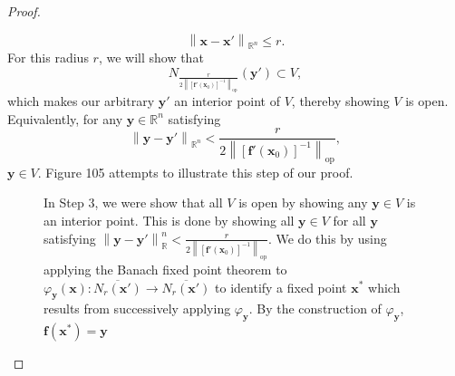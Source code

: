 \documentclass{article}
\newcommand{\R}{\mathbb{R}}
\newcommand{\x}{\mathbf{x}}
\newcommand{\f}{\mathbf{f}}
\newcommand{\y}{\mathbf{y}}
\newcommand{\norm}[1]{\left\lVert#1\right\rVert}
\newcommand{\normop}[1]{\left\lVert#1\right\rVert_\text{op}}
\theoremstyle{definition}
\begin{document}
\begin{proof}
\begin{enumerate}
 \begin{equation}\label{key}
 	 \norm{\x-\x'}_{\R^n} \le r.
 \end{equation}
 For this radius $ r $, we will show that $$ N_{\frac{r}{2\normop{[\f'(\x_0)]^{-1}}}}(\y')\subset V ,$$ which makes our arbitrary $ \y' $ an interior point of $ V $, thereby showing $ V $ is open. Equivalently, for any $ \y\in \R^n $ satisfying
 \begin{equation}\label{key}
 	\norm{\y-\y'}_{\R^n} < \frac{r}{2\normop{[\f'(\x_0)]^{-1}}},
 \end{equation}
 $ \y\in V $. Figure 105 attempts to illustrate this step of our proof.
 

\begin{figure}[h!]
\centering
{}
\caption{In Step 3, we were show that all $ V $ is open by showing any $ \y\in V $ is an interior point. This is done by showing all $ \y\in V $ for all $ \y $ satisfying $ \norm{\y-\y'}_\R^n <\frac{r}{2\normop{[\f'(\x_0)]^{-1}}}  $. We do this by using applying the Banach fixed point theorem to $ \varphi_\y(\x):\overline{N_r(\x')}\to \overline{N_r(\x')} $ to identify a fixed point $ \x^* $ which results from successively applying $ \varphi_\y $. By the construction of $ \varphi_\y $, $ \f(\x^*)=\y $ }
\end{figure}
 

\end{enumerate}
\end{proof}
\end{document}
